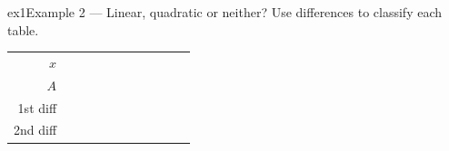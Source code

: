\documentclass[11pt]{article}
\begin{document}
\begin{example}{ex1}{Example 2 --- Linear, quadratic or neither?}
Use differences to classify each table.
\begin{center}\renewcommand{\arraystretch}{1.15}\setlength{\tabcolsep}{2pt}\begin{tabular}{r|>{\centering\arraybackslash}p{0.62cm}>{\centering\arraybackslash}p{0.62cm}>{\centering\arraybackslash}p{0.62cm}>{\centering\arraybackslash}p{0.62cm}>{\centering\arraybackslash}p{0.62cm}>{\centering\arraybackslash}p{0.62cm}>{\centering\arraybackslash}p{0.62cm}>{\centering\arraybackslash}p{0.62cm}>{\centering\arraybackslash}p{0.62cm}>{\centering\arraybackslash}p{0.62cm}}
$x$ & \multicolumn{2}{c}{\colorbox{iagreen}{\makebox[1.12cm]{\strut \color{white}\bfseries $0$}}} & \multicolumn{2}{c}{\colorbox{iagreen}{\makebox[1.12cm]{\strut \color{white}\bfseries $1$}}} & \multicolumn{2}{c}{\colorbox{iagreen}{\makebox[1.12cm]{\strut \color{white}\bfseries $2$}}} & \multicolumn{2}{c}{\colorbox{iagreen}{\makebox[1.12cm]{\strut \color{white}\bfseries $3$}}} & \multicolumn{2}{c}{\colorbox{iagreen}{\makebox[1.12cm]{\strut \color{white}\bfseries $4$}}} \\[2pt]
$A$ & \multicolumn{2}{c}{\colorbox{keybg}{\makebox[1.12cm]{\strut $-2$}}} & \multicolumn{2}{c}{\colorbox{keybg}{\makebox[1.12cm]{\strut $1$}}} & \multicolumn{2}{c}{\colorbox{keybg}{\makebox[1.12cm]{\strut $4$}}} & \multicolumn{2}{c}{\colorbox{keybg}{\makebox[1.12cm]{\strut $7$}}} & \multicolumn{2}{c}{\colorbox{keybg}{\makebox[1.12cm]{\strut $10$}}} \\[2pt]
\textcolor{exblue}{\scriptsize 1st diff} & & \multicolumn{2}{c}{\colorbox{exbg}{\makebox[1.12cm]{\strut \textcolor{exblue}{$+3$}}}} & \multicolumn{2}{c}{\colorbox{exbg}{\makebox[1.12cm]{\strut \textcolor{exblue}{$+3$}}}} & \multicolumn{2}{c}{\colorbox{exbg}{\makebox[1.12cm]{\strut \textcolor{exblue}{$+3$}}}} & \multicolumn{2}{c}{\colorbox{exbg}{\makebox[1.12cm]{\strut \textcolor{exblue}{$+3$}}}} & \\[2pt]
\textcolor{qorange}{\scriptsize 2nd diff} & & & \multicolumn{2}{c}{\colorbox{qbg}{\makebox[1.12cm]{\strut \textcolor{qorange!70!black}{$+0$}}}} & \multicolumn{2}{c}{\colorbox{qbg}{\makebox[1.12cm]{\strut \textcolor{qorange!70!black}{$+0$}}}} & \multicolumn{2}{c}{\colorbox{qbg}{\makebox[1.12cm]{\strut \textcolor{qorange!70!black}{$+0$}}}} & & \\
\end{tabular}\end{center}
\begin{center}\renewcommand{\arraystretch}{1.15}\setlength{\tabcolsep}{2pt}\begin{tabular}{r|>{\centering\arraybackslash}p{0.62cm}>{\centering\arraybackslash}p{0.62cm}>{\centering\arraybackslash}p{0.62cm}>{\centering\arraybackslash}p{0.62cm}>{\centering\arraybackslash}p{0.62cm}>{\centering\arraybackslash}p{0.62cm}>{\centering\arraybackslash}p{0.62cm}>{\centering\arraybackslash}p{0.62cm}>{\centering\arraybackslash}p{0.62cm}>{\centering\arraybackslash}p{0.62cm}}

\end{tabular}
\end{center}
\end{example}
\end{document}
